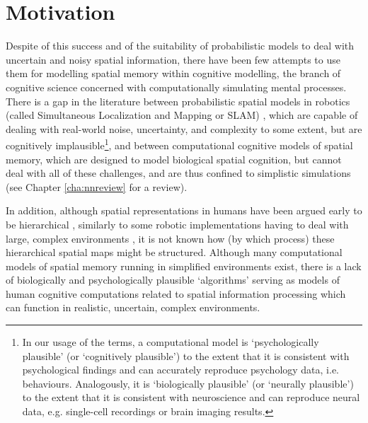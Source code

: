 \section{Motivation}
\label{sec:intro:motivation}

Despite of this success and of the suitability of probabilistic models to deal with uncertain and noisy spatial information, there have been few attempts to use them for modelling spatial memory within cognitive modelling, the branch of cognitive science concerned with computationally simulating mental processes. There is a gap in the literature between probabilistic spatial models in robotics (called Simultaneous Localization and Mapping or SLAM) \citep{thrun2008simultaneous}, which are capable of dealing with real-world noise, uncertainty, and complexity to some extent, but are cognitively implausible\footnote{In our usage of the terms, a computational model is `psychologically plausible' (or `cognitively plausible') to the extent that it is consistent with psychological findings and can accurately reproduce psychology data, i.e. behaviours. Analogously, it is `biologically plausible' (or `neurally plausible') to the extent that it is consistent with neuroscience and can reproduce neural data, e.g. single-cell recordings or brain imaging results.}, and between computational cognitive models of spatial memory, which are designed to model biological spatial cognition, but cannot deal with all of these challenges, and are thus confined to simplistic simulations (see Chapter \ref{cha:nnreview} for a review). 


In addition, although spatial representations in humans have been argued early to be hierarchical \citep{hirtle1985evidence, mcnamara1989subjective, greenauer2010micro}, similarly to some robotic implementations having to deal with large, complex environments \citep{kuipers2000spatial, wurm2010octomap}, it is not known how (by which process) these hierarchical spatial maps might be structured. Although many computational models of spatial memory running in simplified environments exist, there is a lack of biologically and psychologically plausible `algorithms' serving as models of human cognitive computations related to spatial information processing which can function in realistic, uncertain, complex environments.

